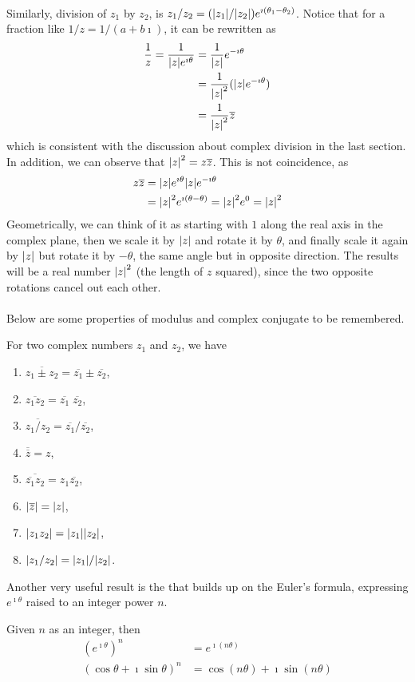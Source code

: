 \\
Similarly, division of $z_1$ by $z_2$, is $z_1/z_2 = (\abs{z_1}/\abs{z_2})e^{\imath (\theta_1-\theta_2)}$. Notice that for a fraction like $1/z = 1/(a+b\imath)$, it can be rewritten as
\begin{align*}
\frac{1}{z} = \frac{1}{\abs{z}e^{\imath \theta}} &= \frac{1}{\abs{z}} e^{-\imath \theta} \\
&= \frac{1}{\abs{z}^2} (\abs{z} e^{-\imath \theta}) \\
&= \frac{1}{\abs{z}^2} \overline{z}
\end{align*}
which is consistent with the discussion about complex division in the last section. In addition, we can observe that $\abs{z}^2 = z\overline{z}$. This is not coincidence, as
\begin{align*}
z\overline{z} &= \abs{z} e^{\imath \theta} \abs{z} e^{-\imath \theta} \\
&= \abs{z}^2 e^{\imath(\theta-\theta)} = \abs{z}^2e^{0} = \abs{z}^2
\end{align*}
Geometrically, we can think of it as starting with $1$ along the real axis in the complex plane, then we scale it by $\abs{z}$ and rotate it by $\theta$, and finally scale it again by $\abs{z}$ but rotate it by $-\theta$, the same angle but in opposite direction. The results will be a real number $\abs{z}^2$ (the length of $z$ squared), since the two opposite rotations cancel out each other.\\
\\
Below are some properties of modulus and complex conjugate to be remembered.
\begin{proper}
\label{proper:complexnum}
For two complex numbers $z_1$ and $z_2$, we have
\begin{enumerate}[label=(\alph*)]
\item $\overline{z_1 \pm z_2} = \overline{z_1} \pm \overline{z_2}$, 
\item $\overline{z_1z_2} = \overline{z_1}\;\overline{z_2}$,
\item $\overline{z_1/z_2} = \overline{z_1}/\overline{z_2}$,
\item $\overline{\overline{z}} = z$,
\item $\overline{\overline{z_1}z_2} = z_1\overline{z_2}$,
\item $\abs{\overline{z}} = \abs{z}$,
\item $\abs{z_1z_2} = \abs{z_1}\abs{z_2}$,
\item $\abs{z_1/z_2} = \abs{z_1}/\abs{z_2}$.
\end{enumerate}
\end{proper}
Another very useful result is the  that builds up on the Euler's formula, expressing $e^{\imath \theta}$ raised to an integer power $n$.
\begin{thm}
Given $n$ as an integer, then
\begin{align*}
(e^{\imath \theta})^n &= e^{\imath (n\theta)} \\
(\cos\theta + \imath \sin\theta)^n &= \cos(n\theta) + \imath \sin(n\theta)
\end{align*}
\end{thm}

